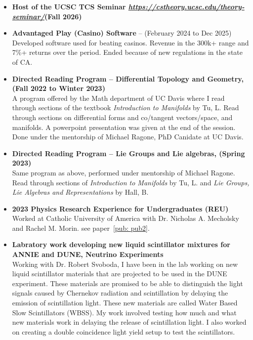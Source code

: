 \documentclass{curriculum-vitae}
\begin{document}
\begin{itemize}
    \item \textbf{Host of the UCSC TCS Seminar \emph{\href{https://cstheory.ucsc.edu/theory-seminar/}{https://cstheory.ucsc.edu/theory-seminar/}}(Fall 2026)}
    \item \textbf{Advantaged Play (Casino) Software} -- (February 2024 to Dec 2025)\\
    Developed software used for beating casinos. Revenue in the 300k+ range and 7\%+ returns over the period. Ended because of new regulations in the state of CA.
    \item \textbf{Directed Reading Program -- Differential Topology and Geometry, (Fall 2022 to Winter 2023)}\\
    A program offered by the Math department of UC Davis where I read through sections of the textbook \emph{Introduction to Manifolds} by Tu, L.
    Read through sections on differential forms and co/tangent vectors/space, and manifolds. A powerpoint presentation was given at the end of the session. 
    Done under the mentorship of Michael Ragone, PhD Canidate at UC Davis. 
    \item \textbf{Directed Reading Program -- Lie Groups and Lie algebras, (Spring 2023)}\\
    Same program as above, performed under mentorship of Michael Ragone. 
    Read through sections of \emph{Introduction to Manifolds} by Tu, L. and \emph{Lie Groups, Lie Algebras and Representations} by Hall, B. 
    \item \textbf{2023 Physics Research Experience for Undergraduates (REU)}\\
    Worked at Catholic University of America with Dr. Nicholas A. Mecholsky and Rachel M. Morin. see paper~\ref{pub: pub2}.
    \item \textbf{Labratory work developing new liquid scintillator mixtures for ANNIE and DUNE, Neutrino Experiments}\\
    Working with Dr. Robert Svoboda, I have been in the lab working on new liquid scintillator materials that are projected to be used in the DUNE experiment. These materials are promised to be able to distinguish the light signals caused by Chernekov radiation and scintillation by delaying the emission of scintillation light. These new materials are called Water Based Slow Scintillators (WBSS). My work involved testing how much and what new materials work in delaying the release of scintillation light. I also worked on creating a double coincidence light yield setup to test the scintillators. 

\end{itemize}
\end{document}
